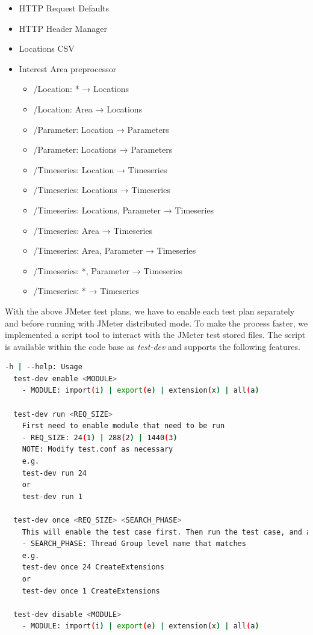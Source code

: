 \begin{itemize}
    \item HTTP Request Defaults
    \item HTTP Header Manager
    \item Locations CSV
    \item Interest Area preprocessor
    \begin{itemize}
        \item /Location: * → Locations
    	\item /Location: Area → Locations
    	\item /Parameter: Location → Parameters
    	\item /Parameter: Locations → Parameters
    	\item /Timeseries: Location → Timeseries
    	\item /Timeseries: Locations → Timeseries
    	\item /Timeseries: Locations, Parameter → Timeseries
    	\item /Timeseries: Area → Timeseries
    	\item /Timeseries: Area, Parameter → Timeseries
    	\item /Timeseries: *, Parameter → Timeseries
    	\item /Timeseries: * → Timeseries
	\end{itemize}
\end{itemize}

With the above JMeter test plans, we have to enable each test plan separately and before running with JMeter distributed mode. To make the process faster, we implemented a script tool to interact with the JMeter test stored files. The script is available within the code base \cite{KarunarathneWdias-performance-test/TEST_PLAN.md:Plan} as \emph{test-dev} and supports the following features.

\begin{lstlisting}[language=sh, caption=Performance Test Help]
-h | --help: Usage
  test-dev enable <MODULE>
    - MODULE: import(i) | export(e) | extension(x) | all(a)

  test-dev run <REQ_SIZE>
    First need to enable module that need to be run
    - REQ_SIZE: 24(1) | 288(2) | 1440(3)
    NOTE: Modify test.conf as necessary
    e.g.
    test-dev run 24
    or
    test-dev run 1

  test-dev once <REQ_SIZE> <SEARCH_PHASE>
    This will enable the test case first. Then run the test case, and at the end disable and exit.
    - SEARCH_PHASE: Thread Group level name that matches
    e.g.
    test-dev once 24 CreateExtensions
    or
    test-dev once 1 CreateExtensions

  test-dev disable <MODULE>
    - MODULE: import(i) | export(e) | extension(x) | all(a)
\end{lstlisting}

